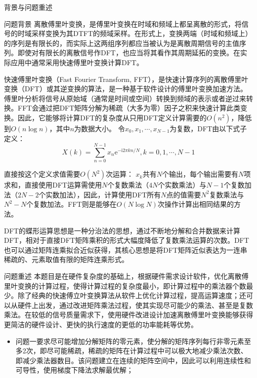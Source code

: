 \documentclass[11pt]{article}
\begin{document}
\begin{section}{背景与问题重述}
 \begin{subsection}{问题背景}
   离散傅里叶变换，是傅里叶变换在时域和频域上都呈离散的形式，将信号的时域采样变换为其DTFT的频域采样。在形式上，变换两端（时域和频域上）的序列是有限长的，而实际上这两组序列都应当被认为是离散周期信号的主值序列。即使对有限长的离散信号作DFT，也应当将其看作其周期延拓的变换。在实际应用中通常采用快速傅里叶变换计算DFT。
   \par
   快速傅里叶变换（Fast Fourier Transform, FFT），是快速计算序列的离散傅里叶变换（DFT）或其逆变换的算法\cite{cooley_algorithm_nodate}，是一种基于软件设计的傅里叶变换加速方法。傅里叶分析将信号从原始域（通常是时间或空间）转换到频域的表示或者逆过来转换。FFT会通过把DFT矩阵分解为稀疏（大多为零）因子之积来快速计算此类变换。因此，它能够将计算DFT的复杂度从只用DFT定义计算需要的$O(n^2)$，降低到$O(n\log n)$，其中$n$为数据大小。
   令$x_0,x_1,\cdots,x_{N-1}$为复数，DFT由以下式子定义：
   \begin{equation}
     X(k)=\sum_{n=0}^{N-1}x_n\mathrm{e}^{-\mathrm{i}2\pi kn/N},k=0,1,\cdots,N-1
   \end{equation}
   \par
   直接按这个定义求值需要$O(N^2)$次运算： $x_k$共有$N$个输出，每个输出需要有$N$项求和，直接使用DFT运算需使用$N$个复数乘法（$4N$个实数乘法）与$N-1$个复数加法（$2N-2$个实数加法），因此，计算使用DFT所有$N$点的值需要$N^2$复数乘法与$N^2-N$个复数加法。FFT则是能够在$O(N\log N)$次操作计算出相同结果的方法。
   \par
   DFT的蝶形运算思想是一种分治法的思想，通过不断地分解和合并数据来计算DFT，相对于直接DFT矩阵乘积的形式大幅度降低了复数乘法运算的次数。DFT也可以通过矩阵连乘拟合近似获得，其核心思想是将DFT矩阵近似表达为一连串稀疏的、元素取值有限的矩阵连乘形式。
 \end{subsection}
 \begin{subsection}{问题重述}
   本题目是在硬件复杂度的基础上，根据硬件需求设计软件，优化离散傅里叶变换的计算过程，使得计算过程的复杂度最小，即计算过程中的乘法器个数最少。除了经典的快速傅立叶变换算法从软件上优化计算过程，提高运算速度；还可以从硬件上出发，通过改进矩阵乘法过程，使其实现尽可能少的乘法、甚至是复数乘法。在较低的信号质量需求下，使用硬件改进设计加速离散傅里叶变换能够获得更简洁的硬件设计、更快的执行速度的更低的功率能耗等优势。
   \par
   \begin{itemize}
     \item 问题一要求尽可能增加分解矩阵的零元素，使分解的矩阵序列每行非零元素至多2次，即尽可能稀疏，稀疏的矩阵在计算过程中可以极大地减少乘法次数、即减少乘法器数目。该问题建立在连续的矩阵空间中，因此可以利用连续性和可导性，使用梯度下降法求解最优解；

\end{itemize}
\end{subsection}
\end{section}
\end{document}
